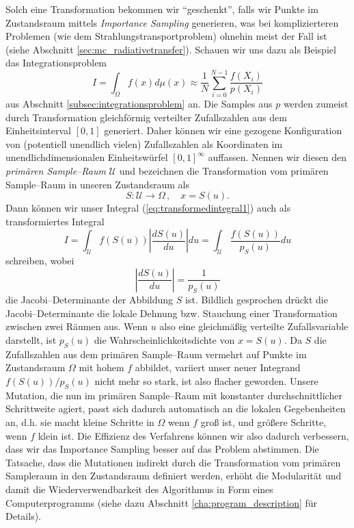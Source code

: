 	Solch eine Transformation bekommen wir ``geschenkt'', falls wir Punkte im Zustandsraum mittels {\em Importance Sampling} generieren, was bei komplizierteren Problemen (wie dem Strahlungstransportproblem) ohnehin meist der Fall ist (siehe Abschnitt \ref{sec:mc_radiativetransfer}). Schauen wir uns dazu als Beispiel das Integrationsproblem
	\begin{equation}
		I=\int_\Omega f(x) d\mu(x)\approx \frac{1}{N}\sum_{i=0}^{N-1} \frac{f(X_i)}{p(X_i)}
		\label{eq:transformedintegral1}
	\end{equation}
	aus Abschnitt \ref{subsec:integrationsproblem} an. Die Samples aus $p$ werden zumeist durch Transformation gleichförmig verteilter Zufallszahlen aus dem Einheitsinterval $[0,1]$ generiert. Daher können wir eine gezogene Konfiguration von (potentiell unendlich vielen) Zufallszahlen als Koordinaten im unendlichdimensionalen Einheitswürfel $[0,1]^\infty$ auffassen. Nennen wir diesen den {\em primären Sample--Raum} $\mathcal{U}$ und bezeichnen die Transformation vom primären Sample--Raum in unseren Zustandsraum als
	$$S : \mathcal{U} \to \Omega\,,\quad x=S(u).$$
	Dann können wir unser Integral (\ref{eq:transformedintegral1}) auch als transformiertes Integral
	$$I=\int_\mathcal{U} f(S(u)) \left|\frac{dS(u)}{du}\right|du=\int_\mathcal{U} \frac{f(S(u))}{p_S(u)}du$$
	schreiben, wobei
	$$\left|\frac{dS(u)}{du}\right|=\frac{1}{p_S(u)}$$
	die Jacobi--Determinante der Abbildung $S$ ist. Bildlich gesprochen drückt die Jacobi--Determinante die lokale Dehnung bzw. Stauchung einer Transformation zwischen zwei Räumen aus. Wenn $u$ also eine gleichmäßig verteilte Zufallsvariable darstellt, ist $p_S(u)$ die Wahrscheinlichkeitsdichte von $x=S(u)$. Da $S$ die Zufallszahlen aus dem primären Sample--Raum vermehrt auf Punkte im Zustandsraum $\Omega$ mit hohem $f$ abbildet, variiert unser neuer Integrand $f(S(u))/p_S(u)$ nicht mehr so stark, ist also flacher geworden. Unsere Mutation, die nun im primären Sample--Raum mit konstanter durchschnittlicher Schrittweite agiert, passt sich dadurch automatisch an die lokalen Gegebenheiten an, d.h. sie macht kleine Schritte in $\Omega$ wenn $f$ groß ist, und größere Schritte, wenn $f$ klein ist. Die Effizienz des Verfahrens können wir also dadurch verbessern, dass wir das Importance Sampling besser auf das Problem abstimmen. Die Tatsache, dass die Mutationen indirekt durch die Transformation vom primären Sampleraum in den Zustandsraum definiert werden, erhöht die Modularität und damit die Wiederverwendbarkeit des Algorithmus in Form eines Computerprogramms (siehe dazu Abschnitt \ref{cha:program_description} für Details).

